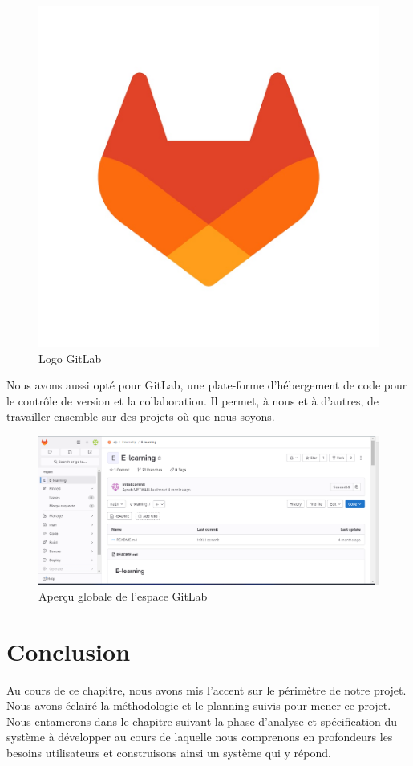\begin{figure}[H]
    \centering
    \includegraphics[scale=0.1]{Logos/gitlab.jpg}
    \caption{Logo GitLab}
\end{figure}

Nous avons aussi opté pour GitLab, une plate-forme d'hébergement de code pour le
contrôle de version et la collaboration. Il permet, à nous et à d'autres, de travailler ensemble sur
des projets où que nous soyons.

\begin{figure}[H]
    \centering
    \includegraphics[width=19cm]{Figures/apercu.png}
    \caption{Aperçu globale de l'espace GitLab}
\end{figure}
\newpage

\section*{Conclusion}
Au cours de ce chapitre, nous avons mis l’accent sur le périmètre de notre projet. Nous avons éclairé
la méthodologie et le planning suivis pour mener ce projet. Nous entamerons dans le chapitre suivant
la phase d’analyse et spécification du système à développer au cours de laquelle nous comprenons en
profondeurs les besoins utilisateurs et construisons ainsi un système qui y répond.

